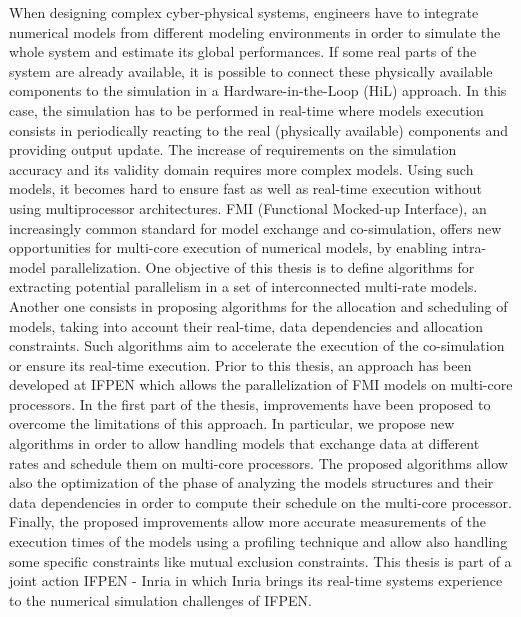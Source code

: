 When designing complex cyber-physical systems, engineers have to integrate numerical models
from different
modeling environments in order to simulate the whole system and estimate its global
performances. If some real parts of the system are already available, it is possible to connect these
physically available components to the simulation in a Hardware-in-the-Loop (HiL) approach. In this case, the
simulation has to be performed in real-time where models execution consists in periodically
reacting to the real (physically available) components and providing output update. The
increase of requirements on the simulation accuracy and its validity domain requires more
complex models. Using such models, it becomes hard to ensure fast as well as real-time execution without using
multiprocessor architectures. FMI (Functional Mocked-up Interface), an increasingly common
standard for model exchange and co-simulation, offers
new opportunities for multi-core execution
of numerical models, by enabling intra-model parallelization. One objective of this thesis is to
define algorithms for extracting potential parallelism in a set of interconnected multi-rate models.
Another one consists in proposing algorithms for the allocation and scheduling of models, taking %
into account their real-time, data dependencies and allocation constraints. Such algorithms aim to accelerate the execution of the co-simulation or ensure its real-time execution. Prior to this thesis,
an approach has been developed at IFPEN which allows the parallelization of FMI models on
multi-core processors. In the first part of the thesis, improvements have been proposed to overcome
the limitations of this approach. In particular, we propose new algorithms in order to allow
handling models that exchange data at different
rates and schedule them on multi-core processors.
The proposed algorithms allow also the optimization of the phase of analyzing the models structures and
their data dependencies in order to compute their schedule on the multi-core processor. Finally, the
proposed improvements allow more accurate measurements of the execution times of the models using a profiling technique and allow also handling some specific constraints like mutual exclusion constraints. This thesis is part of a joint action IFPEN - Inria in which Inria brings its
real-time systems experience to the numerical simulation challenges of IFPEN.